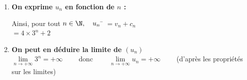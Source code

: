 \documentclass[a4paper,11pt,cours]{nsi} %
\begin{document}
\begin{methode}
\begin{enumerate}[label=\textbullet]
        \item \textbf{On exprime $u_n$ en fonction de $n$ :}
        \begin{tabbing}
            Ainsi, pour tout $n\in\N, \quad u_n$ \= $=v_n+c_n$\\
                \>  $=4\times 3^n+2$
        \end{tabbing}

        \item \textbf{On peut en déduire la limite de $(u_n)$}\\
        $\lim\limits_{n\to+\infty} 3^n=+\infty\qquad$ donc $\qquad \lim\limits_{n\to+\infty} u_n=+\infty \qquad$ (d'après les propriétés sur les limites)
    \end{enumerate}
\end{methode}
\end{document}
